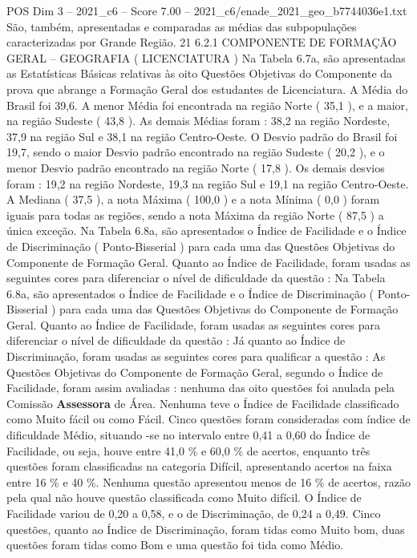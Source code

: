 \begin{textsample}{POS Dim 3 – 2021\_c6 – Score 7.00 – 2021\_c6/enade\_2021\_geo\_b7744036e1.txt}
São, também, apresentadas e comparadas as médias das subpopulações caracterizadas por Grande Região. 21 6.2.1 COMPONENTE DE FORMAÇÃO GERAL – GEOGRAFIA ( LICENCIATURA ) Na Tabela 6.7a, são apresentadas as Estatísticas Básicas relativas às oito Questões Objetivas do Componente da prova que abrange a Formação Geral dos estudantes de Licenciatura.
A Média do Brasil foi 39,6.
A menor Média foi encontrada na região Norte ( 35,1 ), e a maior, na região Sudeste ( 43,8 ).
As demais Médias foram : 38,2 na região Nordeste, 37,9 na região Sul e 38,1 na região Centro-Oeste.
O Desvio padrão do Brasil foi 19,7, sendo o maior Desvio padrão encontrado na região Sudeste ( 20,2 ), e o menor Desvio padrão encontrado na região Norte ( 17,8 ).
Os demais desvios foram : 19,2 na região Nordeste, 19,3 na região Sul e 19,1 na região Centro-Oeste.
A Mediana ( 37,5 ), a nota Máxima ( 100,0 ) e a nota Mínima ( 0,0 ) foram iguais para todas as regiões, sendo a nota Máxima da região Norte ( 87,5 ) a única exceção.
Na Tabela 6.8a, são apresentados o Índice de Facilidade e o Índice de Discriminação ( Ponto-Bisserial ) para cada uma das Questões Objetivas do Componente de Formação Geral.
Quanto ao Índice de Facilidade, foram usadas as seguintes cores para diferenciar o nível de dificuldade da questão : Na Tabela 6.8a, são apresentados o Índice de Facilidade e o Índice de Discriminação ( Ponto-Bisserial ) para cada uma das Questões Objetivas do Componente de Formação Geral.
Quanto ao Índice de Facilidade, foram usadas as seguintes cores para diferenciar o nível de dificuldade da questão : Já quanto ao Índice de Discriminação, foram usadas as seguintes cores para qualificar a questão : As Questões Objetivas do Componente de Formação Geral, segundo o Índice de Facilidade, foram assim avaliadas : nenhuma das oito questões foi anulada pela Comissão \textbf{Assessora} de Área.
Nenhuma teve o Índice de Facilidade classificado como Muito fácil ou como Fácil.
Cinco questões foram consideradas com índice de dificuldade Médio, situando -se no intervalo entre 0,41 a 0,60 do Índice de Facilidade, ou seja, houve entre 41,0 \% e 60,0 \% de acertos, enquanto três questões foram classificadas na categoria Difícil, apresentando acertos na faixa entre 16 \% e 40 \%.
Nenhuma questão apresentou menos de 16 \% de acertos, razão pela qual não houve questão classificada como Muito difícil.
O Índice de Facilidade variou de 0,20 a 0,58, e o de Discriminação, de 0,24 a 0,49.
Cinco questões, quanto ao Índice de Discriminação, foram tidas como Muito bom, duas questões foram tidas como Bom e uma questão foi tida como Médio.

\end{textsample}
